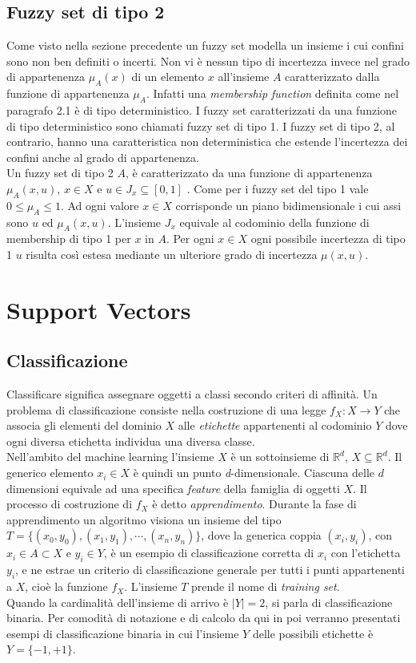 \documentclass [10pt,a4paper,twoside,openright] {book}
\begin{document}
\section{Fuzzy set di tipo 2}
Come visto nella sezione precedente un fuzzy set modella un insieme i cui confini sono non ben definiti o incerti. Non vi è nessun tipo di incertezza invece nel grado di appartenenza $\mu_A(x)$ di un elemento $x$ all'insieme $A$ caratterizzato dalla funzione di appartenenza $\mu_A$. Infatti una \textit{membership function} definita come nel paragrafo 2.1 è di tipo deterministico. I fuzzy set caratterizzati da una funzione di tipo deterministico sono chiamati fuzzy set di tipo 1. I fuzzy set di tipo 2, al contrario, hanno una caratteristica non deterministica che estende l'incertezza dei confini anche al grado di appartenenza.\\
Un fuzzy set di tipo 2 $A$, è caratterizzato da una funzione di appartenenza $\mu_{A}(x,u)$, $x \in X$ e $u \in J_x \subseteq [0, 1]$ \cite{mendel2002type}. Come per i fuzzy set del tipo 1 vale $0 \leq \mu_{A} \leq 1$. Ad ogni valore $x \in X$  corrisponde un piano bidimensionale i cui assi sono $u$ ed $\mu_{A}(x,u)$. L'insieme $J_x$ equivale al codominio della funzione di membership di tipo 1 per $x$ in $A$. Per ogni $x \in X$ ogni possibile incertezza di tipo 1 $u$ risulta così estesa mediante un ulteriore grado di incertezza $\mu(x,u)$.
\chapter{Support Vectors}
\section{Classificazione}
Classificare significa assegnare oggetti a classi secondo criteri di affinità. Un problema di classificazione consiste nella costruzione di una legge $f_X: X \rightarrow Y$ che associa gli elementi del dominio $X$ alle \textit{etichette} appartenenti al codominio $Y$ dove ogni diversa etichetta individua una diversa classe.\\
Nell'ambito del machine learning l'insieme $X$ è un sottoinsieme di $\mathbb{R}^d$, $X \subseteq \mathbb{R}^d$. Il generico elemento $x_i \in X$ è quindi un punto \textit{d}-dimensionale. Ciascuna delle $d$ dimensioni equivale ad una specifica \textit{feature} della famiglia di oggetti $X$. Il processo di costruzione di $f_X$ è detto \textit{apprendimento}. Durante la fase di apprendimento un algoritmo visiona un insieme del tipo $T=\lbrace (x_0,y_0), (x_1,y_1), \cdots, (x_n,y_n) \rbrace$,  dove la generica coppia $(x_i,y_i)$, con $x_i \in A \subset X$ e $y_i \in Y$, è un esempio di classificazione corretta di $x_i$ con l'etichetta $y_i$, e ne estrae un criterio di classificazione generale per tutti i punti appartenenti a $X$, cioè la funzione $f_X$. L'insieme $T$ prende il nome di \textit{training set}.\\
Quando la cardinalità dell'insieme di arrivo è $|Y| = 2$, si parla di classificazione binaria. Per comodità di notazione e di calcolo da qui in poi verranno presentati esempi di classificazione binaria in cui l'insieme $Y$ delle possibili etichette è $Y=\lbrace -1, +1 \rbrace$.
\end{document}
